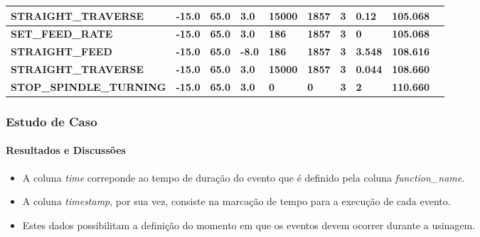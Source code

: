 \documentclass[aspectratio=169]{beamer}
\begin{document}
{\begin{frame}[fragile]
\begin{tabular}{|l|l|l|l|l|l|l|l|l|l|}
      \tiny{\bfseries{STRAIGHT\_TRAVERSE}} & 
      \tiny{\bfseries{-15.0}} & 
      \tiny{\bfseries{65.0}} & 
      \tiny{\bfseries{3.0}} & 
      \tiny{\bfseries{15000}} & 
      \tiny{\bfseries{1857}} & 
      \tiny{\bfseries{3}} & 
      \tiny{\bfseries{0.12}} & 
      \tiny{\bfseries{105.068}} \\
      \hline

      \tiny{\bfseries{SET\_FEED\_RATE}} & 
      \tiny{\bfseries{-15.0}} & 
      \tiny{\bfseries{65.0}} & 
      \tiny{\bfseries{3.0}} & 
      \tiny{\bfseries{186}} & 
      \tiny{\bfseries{1857}} & 
      \tiny{\bfseries{3}} & 
      \tiny{\bfseries{0}} & 
      \tiny{\bfseries{105.068}} \\
      \hline

      \tiny{\bfseries{STRAIGHT\_FEED}} & 
      \tiny{\bfseries{-15.0}} & 
      \tiny{\bfseries{65.0}} & 
      \tiny{\bfseries{-8.0}} & 
      \tiny{\bfseries{186}} & 
      \tiny{\bfseries{1857}} & 
      \tiny{\bfseries{3}} & 
      \tiny{\bfseries{3.548}} & 
      \tiny{\bfseries{108.616}} \\
      \hline

      \tiny{\bfseries{STRAIGHT\_TRAVERSE}} & 
      \tiny{\bfseries{-15.0}} & 
      \tiny{\bfseries{65.0}} & 
      \tiny{\bfseries{3.0}} & 
      \tiny{\bfseries{15000}} & 
      \tiny{\bfseries{1857}} & 
      \tiny{\bfseries{3}} & 
      \tiny{\bfseries{0.044}} & 
      \tiny{\bfseries{108.660}} \\
      \hline

      \tiny{\bfseries{STOP\_SPINDLE\_TURNING}} & 
      \tiny{\bfseries{-15.0}} & 
      \tiny{\bfseries{65.0}} & 
      \tiny{\bfseries{3.0}} & 
      \tiny{\bfseries{0}} & 
      \tiny{\bfseries{0}} & 
      \tiny{\bfseries{3}} & 
      \tiny{\bfseries{2}} & 
      \tiny{\bfseries{110.660}} \\
      \hline

  \end{tabular}

\end{frame}


\begin{frame}[fragile]
  \frametitle{Estudo de Caso}
  \framesubtitle{Resultados e Discussões}

  \begin{itemize}
    \item A coluna \emph{time} correponde ao tempo de duração do evento 
    que é definido pela coluna \emph{function\_name}.
    \item A coluna \emph{timestamp}, por sua vez, consiste na 
    marcação de tempo para a execução de cada evento.
    \item Estes dados possibilitam a definição do momento em que os 
          eventos devem ocorrer durante a usinagem.
  \end{itemize}


\end{frame}}
\end{document}
